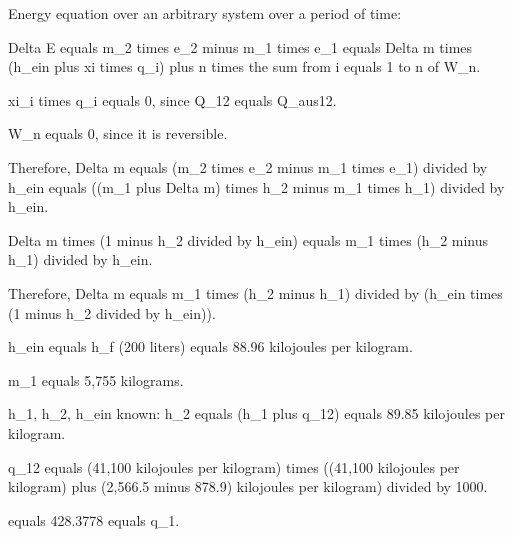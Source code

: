Energy equation over an arbitrary system over a period of time:

Delta E equals m_2 times e_2 minus m_1 times e_1 equals Delta m times (h_ein plus xi times q_i) plus n times the sum from i equals 1 to n of W_n.

xi_i times q_i equals 0, since Q_12 equals Q_aus12.

W_n equals 0, since it is reversible.

Therefore, Delta m equals (m_2 times e_2 minus m_1 times e_1) divided by h_ein equals ((m_1 plus Delta m) times h_2 minus m_1 times h_1) divided by h_ein.

Delta m times (1 minus h_2 divided by h_ein) equals m_1 times (h_2 minus h_1) divided by h_ein.

Therefore, Delta m equals m_1 times (h_2 minus h_1) divided by (h_ein times (1 minus h_2 divided by h_ein)).

h_ein equals h_f (200 liters) equals 88.96 kilojoules per kilogram.

m_1 equals 5,755 kilograms.

h_1, h_2, h_ein known: h_2 equals (h_1 plus q_12) equals 89.85 kilojoules per kilogram.

q_12 equals (41,100 kilojoules per kilogram) times ((41,100 kilojoules per kilogram) plus (2,566.5 minus 878.9) kilojoules per kilogram) divided by 1000.

equals 428.3778 equals q_1.